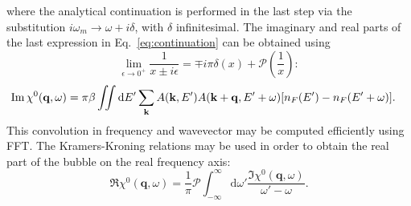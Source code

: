 \documentclass[preprint,prb,amsmath,superscriptaddress,showpacs]{revtex4}
\newcommand{\bk}{\mathbf{k}}
\newcommand{\bq}{\mathbf{q}}
\begin{document}
where the analytical continuation is performed in the last step via the
substitution $i\omega_m \rightarrow \omega + i\delta$, with $\delta$
infinitesimal. The imaginary and real parts of the last expression in
Eq.~\ref{eq:continuation} can be obtained using
%
\begin{equation}
  \lim_{\epsilon \rightarrow 0^{+}} \frac{1}{x \pm i\epsilon} = \mp
  i\pi\delta (x) + \mathcal{P}\left( \frac{1}{x} \right):
\end{equation}
%
\begin{equation}
  \begin{aligned}
    \Im \chi^0(\bq, \omega)
    &= \pi \beta
    \iint
    \mathrm{d} E'
    \sum_{\bk} A(\bk, E') 
    A(\bk + \bq, E' + \omega)
    \qty[n_F(E') - n_F(E' + \omega) ].
    \end{aligned}
\end{equation}
This convolution in frequency and wavevector may be computed
efficiently using FFT. The Kramers-Kroning relations may be used in
order to obtain the real part of the bubble on the real frequency axis:
%
\begin{equation}
  \Re \chi^0(\bq, \omega) =
  \dfrac{1}{\pi} \mathcal{P}
  \int_{-\infty}^{\infty}
  \mathrm{d} \omega' \frac{\Im \chi^0(\bq, \omega)}{\omega' - \omega}.
\end{equation}
%

\iffalse
Using RPA approximation we can further write spectral function
$A(\mathbf{k}, E)$ as
%
\begin{equation}
A(\mathbf{k}, E) = - \frac{1}{\pi} \mathrm{Im} (G_{\mathrm{ret}}(\mathbf{k}, E)) =
\frac{1}{\pi} \frac{-\mathrm{Im}(\Sigma)}{\left( E -
    \varepsilon_{\mathbf{k}} + \mu - \mathrm{Re}(\Sigma) \right)^2 + (\mathrm{Im}(\Sigma))^2}.
\end{equation}
%
Here, $\Sigma$ marks RPA self-energy.
\fi


\end{document}
